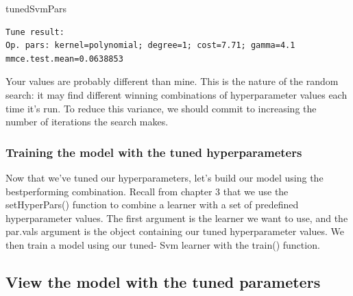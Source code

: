 \documentclass[
]{article}
\newenvironment{Shaded}{\begin{snugshade}}{\end{snugshade}}
\newcommand{\AttributeTok}[1]{\textcolor[rgb]{0.13,0.29,0.53}{#1}}
\newcommand{\FunctionTok}[1]{\textcolor[rgb]{0.13,0.29,0.53}{\textbf{#1}}}
\newcommand{\NormalTok}[1]{#1}
\newcommand{\OtherTok}[1]{\textcolor[rgb]{0.56,0.35,0.01}{#1}}
\newcommand{\SpecialCharTok}[1]{\textcolor[rgb]{0.81,0.36,0.00}{\textbf{#1}}}
\newcommand{\StringTok}[1]{\textcolor[rgb]{0.31,0.60,0.02}{#1}}
\begin{document}
\begin{Shaded}
\begin{Highlighting}[]
\NormalTok{tunedSvmPars}
\end{Highlighting}
\end{Shaded}

\begin{verbatim}
Tune result:
Op. pars: kernel=polynomial; degree=1; cost=7.71; gamma=4.1
mmce.test.mean=0.0638853
\end{verbatim}

Your values are probably different than mine. This is the nature of the
random search: it may find different winning combinations of
hyperparameter values each time it's run. To reduce this variance, we
should commit to increasing the number of iterations the search makes.

\subsubsection{Training the model with the tuned
hyperparameters}\label{training-the-model-with-the-tuned-hyperparameters}

Now that we've tuned our hyperparameters, let's build our model using
the bestperforming combination. Recall from chapter 3 that we use the
setHyperPars() function to combine a learner with a set of predefined
hyperparameter values. The first argument is the learner we want to use,
and the par.vals argument is the object containing our tuned
hyperparameter values. We then train a model using our tuned- Svm
learner with the train() function.

\begin{Shaded}
\end{Shaded}

\subsection{View the model with the tuned
parameters}\label{view-the-model-with-the-tuned-parameters}
\end{document}
